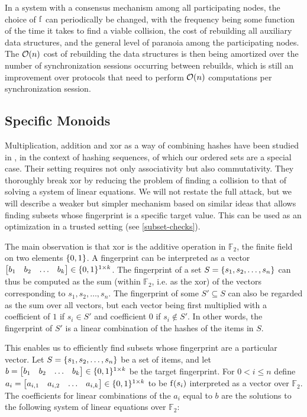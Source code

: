 In a system with a consensus mechanism among all participating nodes, the choice of $\operatorname{f}$ can periodically be changed, with the frequency being some function of the time it takes to find a viable collision, the cost of rebuilding all auxiliary data structures, and the general level of paranoia among the participating nodes. The $\mathcal{O}(n)$ cost of rebuilding the data structures is then being amortized over the number of synchronization sessions occurring between rebuilds, which is still an improvement over protocols that need to perform $\mathcal{O}(n)$ computations per synchronization session.

\subsection{Specific Monoids}
\label{specific-monoids}

Multiplication, addition and xor as a way of combining hashes have been studied in \cite{bellare1997new}, in the context of hashing sequences, of which our ordered sets are a special case. Their setting requires not only associativity but also commutativity. They thoroughly break xor by reducing the problem of finding a collision to that of solving a system of linear equations. We will not restate the full attack, but we will describe a weaker but simpler mechanism based on similar ideas that allows finding subsets whose fingerprint is a specific target value. This can be used as an optimization in a trusted setting (see \cref{subset-checks}).

The main observation is that xor is the additive operation in $\mathds{F}_2$, the finite field on two elements $\{0, 1\}$. A fingerprint can be interpreted as a vector $\begin{bmatrix}b_1 & b_2 & \ldots & b_k\end{bmatrix} \in \{0, 1\}^{1 \times k}$. The fingerprint of a set $S = \{s_1, s_2, \ldots, s_n\}$ can thus be computed as the sum (within $\mathds{F}_2$, i.e. as the xor) of the vectors corresponding to $s_1, s_2, \ldots, s_n$. The fingerprint of some $S' \subseteq S$ can also be regarded as the sum over all vectors, but each vector being first multiplied with a coefficient of $1$ if $s_i \in S'$ and coefficient $0$ if $s_i \notin S'$. In other words, the fingerprint of $S'$ is a linear combination of the hashes of the items in $S$.

This enables us to efficiently find subsets whose fingerprint are a particular vector. Let $S = \{s_1, s_2, \ldots, s_n\}$ be a set of items, and let $b = \begin{bmatrix}b_1 & b_2 & \ldots & b_k\end{bmatrix} \in \{0, 1\}^{1 \times k}$ be the target fingerprint. For $0 < i \leq n$ define $a_i = \begin{bmatrix}a_{i, 1} & a_{i, 2} & \ldots & a_{i, k}\end{bmatrix} \in \{0, 1\}^{1 \times k}$ to be $\operatorname{f}(s_i)$ interpreted as a vector over $\mathds{F}_2$. The coefficients for linear combinations of the $a_i$ equal to $b$ are the solutions to the following system of linear equations over $\mathds{F}_2$:

